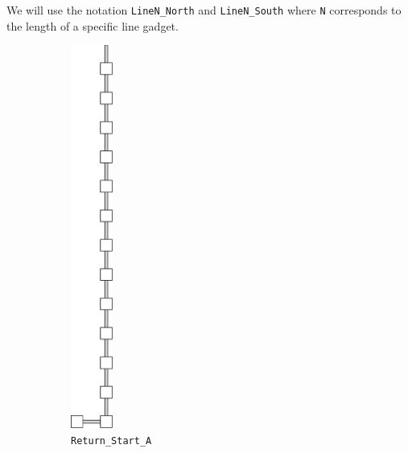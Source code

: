 We will use the notation {\tt LineN\_North} and {\tt LineN\_South} where {\tt N} corresponds to the length of a specific line gadget.



\begin{figure}[H]
    \centering
    \begin{subfigure}[t]{0.25\textwidth}
        \centering
        \includegraphics[width=0.15\textwidth]{return_paths/return_path_start_digits_2_and_3}
        \caption{\label{fig:return_start_a} {\tt Return\_Start\_A}}
    \end{subfigure}%
    ~
    \begin{subfigure}[t]{0.25\textwidth}
        \centering

\end{subfigure}
\end{figure}
